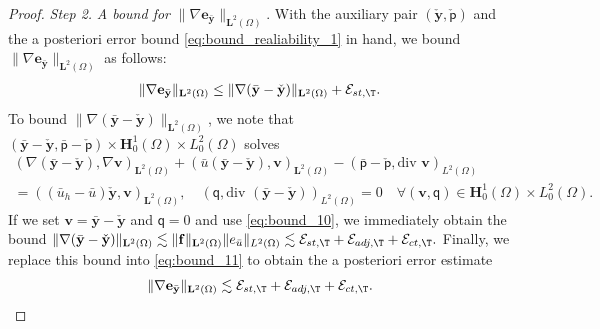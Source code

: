 \documentclass[final]{siamart0216}
\begin{document}
\begin{proof}
\emph{Step 2.} \emph{A bound for} $\|\nabla \mathbf{e}_{\bar{\mathbf{y}}}\|_{\mathbf{L}^2(\Omega)}$. With the auxiliary pair $(\check{\mathbf{y}},\check{\mathsf{p}})$ and the a posteriori error bound \eqref{eq:bound_realiability_1} in hand, we bound $\|\nabla \mathbf{e}_{\bar{\mathbf{y}}}\|_{\mathbf{L}^2(\Omega)}$ as follows:
\begin{align}\label{eq:bound_11}
\|\nabla \mathbf{e}_{\bar{\mathbf{y}}}\|_{\mathbf{L}^2(\Omega)}\leq \|\nabla(\bar{\mathbf{y}}-\check{\mathbf{y}})\|_{\mathbf{L}^2(\Omega)}+\mathcal{E}_{st,\T}.
\end{align}
To bound $\|\nabla(\bar{\mathbf{y}}-\check{\mathbf{y}})\|_{\mathbf{L}^2(\Omega)}$, we note that $(\bar{\mathbf{y}}-\check{\mathbf{y}},\bar{\mathsf{p}}-\check{\mathsf{p}})\times \mathbf{H}_0^1(\Omega)\times L_0^2(\Omega)$ solves 
\begin{multline}\label{eq:brinkamn_problem_state_aux_errorB}
(\nabla (\bar{\mathbf{y}}-\check{\mathbf{y}}),\nabla \mathbf{v})_{\mathbf{L}^2(\Omega)}
+
( \bar{u}(\bar{\mathbf{y}}-\check{\mathbf{y}}), \mathbf{v})_{\mathbf{L}^2(\Omega)}
-
(\bar{\mathsf{p}}-\check{\mathsf{p}},\text{div }\mathbf{v})_{L^2(\Omega)}
\\
=
((\bar{u}_h-\bar{u})\check{\mathbf{y}},\mathbf{v})_{\mathbf{L}^2(\Omega)},
\quad
(\mathsf{q},\text{div }(\bar{\mathbf{y}}-\check{\mathbf{y}}))_{L^2(\Omega)}  =  0 
\quad
\forall (\mathbf{v},\mathsf{q})\in  \mathbf{H}_0^1(\Omega)\times L_0^2(\Omega). 
\end{multline}
If we set $\mathbf{v}=\bar{\mathbf{y}}-\check{\mathbf{y}}$ and $\mathsf{q}=0$ and use \eqref{eq:bound_10}, we immediately obtain the bound
$
\|\nabla (\bar{\mathbf{y}}-\check{\mathbf{y}})\|_{\mathbf{L}^2(\Omega)}\lesssim 
\|\mathbf{f}\|_{\mathbf{L}^2(\Omega)} \|e_{\bar{u}}\|_{L^2(\Omega)}\lesssim \mathcal{E}_{st,\T}+\mathcal{E}_{adj,\T}+\mathcal{E}_{ct,\T}.
$
Finally, we replace this bound into \eqref{eq:bound_11} to obtain the a posteriori error estimate
\begin{align}\label{eq:bound_12}
\|\nabla \mathbf{e}_{\bar{\mathbf{y}}}\|_{\mathbf{L}^2(\Omega)}\lesssim \mathcal{E}_{st,\T}+\mathcal{E}_{adj,\T}+\mathcal{E}_{ct,\T}.
\end{align}


\end{proof}
\end{document}
